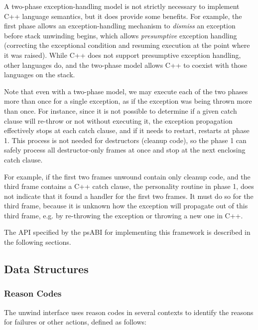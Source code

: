 A two-phase exception-handling model is not strictly necessary to
implement C++ language semantics, but it does provide some benefits. For
example, the first phase allows an exception-handling mechanism to
\emph{dismiss} an exception before stack unwinding begins, which allows
\emph{presumptive} exception handling (correcting the exceptional condition
and resuming execution at the point where it was raised). While C++ does
not support presumptive exception handling, other languages do, and the
two-phase model allows C++ to coexist with those languages on the stack.

Note that even with a two-phase model, we may execute each of the two
phases more than once for a single exception, as if the exception was
being thrown more than once. For instance, since it is not possible to
determine if a given catch clause will re-throw or not without executing
it, the exception propagation effectively stops at each catch clause,
and if it needs to restart, restarts at phase 1. This process is not
needed for destructors (cleanup code), so the phase 1 can safely process
all destructor-only frames at once and stop at the next enclosing
catch clause.

For example, if the first two frames unwound contain only cleanup code,
and the third frame contains a C++ catch clause, the personality routine
in phase 1, does not indicate that it found a handler for the first two
frames. It must do so for the third frame, because it is unknown how the
exception will propagate out of this third frame, e.g. by re-throwing the
exception or throwing a new one in C++.

The API specified by the \xARCH psABI for implementing this framework
is described in the following sections.

\subsection{Data Structures}

\subsubsection{Reason Codes}

The unwind interface uses reason codes in several contexts to identify the
reasons for failures or other actions, defined as follows:

